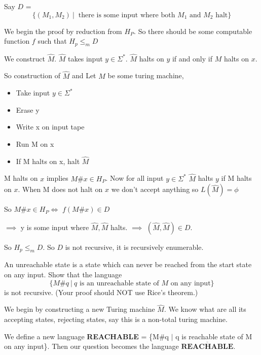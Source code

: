 \documentclass[12pt,a4, onecolumn]{exam}
\begin{document}
\begin{questions}
    \begin{solution}
        Say $D$ = \[\{ (M_1, M_2)~|~\mbox{ there is some input where both $M_1$  and $M_2 $ halt}\}\]
        
        We begin the proof by reduction from $H_P$. So there should be some computable function $f$ such that $H_p \leq_m D$

        We construct $\hat{M}$. $\hat{M}$ takes input $y \in \Sigma^*$. $\hat{M}$ halts on $y$ if and only if $M$ halts on $x$.
        
        So construction of $\hat{M}$ and Let $M$ be some turing machine,
        \begin{itemize}
            \item Take input $y \in \Sigma^*$
            \item Erase y
            \item Write x on input tape
            \item Run M on x
            \item If M halts on x, halt $\hat{M}$
        \end{itemize}

        M halts on $x$ implies $M\#x \in H_P$. Now for all input $y \in \Sigma^*$ $\hat{M}$ halts $y$ if M halts on $x$.
        When M does not halt on $x$ we don't accept anything so $L(\hat{M}) = \phi$

        So $M\#x \in H_P \iff$ $f(M\#x) \in D$
        
        $\implies$ y is some input where $\hat{M}, \hat{M}$ halts. $\implies$ $(\hat{M}, \hat{M}) \in D$.

        So $H_p \leq_m D$. So $D$ is not recursive, it is recursively enumerable.
    \end{solution}

    \question An unreachable state is a state which can never be reached from the start state on any input.  Show that the language
		\[ \{ M\# q~|~ q \mbox{ is an unreachable state  of $M$ on any input} \}\]
		is not recursive. (Your proof should NOT use Rice's theorem.)
  
    \begin{solution}
        We begin by constructing a new Turing machine $\hat{M}$. We know what are all its accepting states, rejecting states, say this is a non-total turing machine.
        
        We define a new language \textbf{REACHABLE} = \{M\#q $\mid$ q is reachable state of M on any input\}. Then our question becomes the language $\overline{\textbf{REACHABLE}}$.


\end{solution}
\end{questions}
\end{document}
